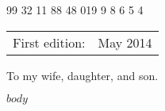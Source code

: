 \documentclass[14pt]{book}
\newcommand\blankpage{%
    \null
    \thispagestyle{empty}%
    \addtocounter{page}{-1}%
    \newpage}
\begin{document}
  \begin{center}
    99 32 11 88 48 01\hspace{2em}9 9 8 6 5 4 %
  \end{center}

  \begin{center}
  \begin{tabular}{ll}
    First edition:  & May 2014
  \end{tabular}
  \end{center}

  \vfill
  \vspace*{2\baselineskip}
  \clearpage
  \endgroup

  \begingroup
  \vspace*{\fill}
  \begin{center}
  To my wife, daughter, and son.
  \end{center}
  \vspace*{\fill}
  \afterpage{\blankpage}
  \endgroup
  \setcounter{page}{0}
  \clearpage
  

  
  \pagestyle{fancy}

  $body$
\end{document}
